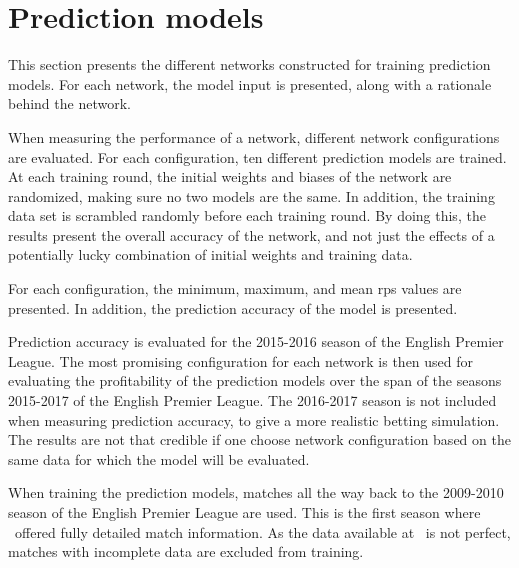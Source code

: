 \section{Prediction models}
\label{sec:prediciton-models}

This section presents the different networks constructed for training prediction models. For each network, the model input is presented, along with a rationale behind the network.

When measuring the performance of a network, different network configurations are evaluated. For each configuration, ten different prediction models are trained. At each training round, the initial weights and biases of the network are randomized, making sure no two models are the same. In addition, the training data set is scrambled randomly before each training round. By doing this, the results present the overall accuracy of the network, and not just the effects of a potentially lucky combination of initial weights and training data.

For each configuration, the minimum, maximum, and mean \gls{rps} values are presented. In addition, the prediction accuracy of the model is presented.

Prediction accuracy is evaluated for the 2015-2016 season of the English Premier League. The most promising configuration for each network is then used for evaluating the profitability of the prediction models over the span of the seasons 2015-2017 of the English Premier League. The 2016-2017 season is not included when measuring prediction accuracy, to give a more realistic betting simulation. The results are not that credible if one choose network configuration based on the same data for which the model will be evaluated.

When training the prediction models, matches all the way back to the 2009-2010 season of the English Premier League are used. This is the first season where \\ \whoscored\ offered fully detailed match information. As the data available at \whoscored\ is not perfect, matches with incomplete data are excluded from training.